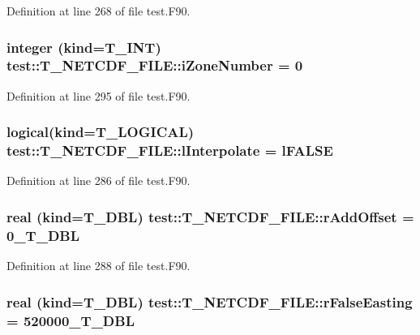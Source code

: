 Definition at line 268 of file test.F90.

\hypertarget{typetest_1_1_t___n_e_t_c_d_f___f_i_l_e_ad7bf8dac2263d91cbf76a6c022f38df5}{
\subsubsection[{iZoneNumber}]{\setlength{\rightskip}{0pt plus 5cm}integer (kind={\bf T\_\-INT}) {\bf test::T\_\-NETCDF\_\-FILE::iZoneNumber} = 0}}
\label{typetest_1_1_t___n_e_t_c_d_f___f_i_l_e_ad7bf8dac2263d91cbf76a6c022f38df5}


Definition at line 295 of file test.F90.

\hypertarget{typetest_1_1_t___n_e_t_c_d_f___f_i_l_e_ad0ad77a4e58dd916eaf322b5dd4429c0}{
\subsubsection[{lInterpolate}]{\setlength{\rightskip}{0pt plus 5cm}logical(kind={\bf T\_\-LOGICAL}) {\bf test::T\_\-NETCDF\_\-FILE::lInterpolate} = {\bf lFALSE}}}
\label{typetest_1_1_t___n_e_t_c_d_f___f_i_l_e_ad0ad77a4e58dd916eaf322b5dd4429c0}


Definition at line 286 of file test.F90.

\hypertarget{typetest_1_1_t___n_e_t_c_d_f___f_i_l_e_a69bbdef63dab58a45d70ab3e374b4e5d}{
\subsubsection[{rAddOffset}]{\setlength{\rightskip}{0pt plus 5cm}real (kind={\bf T\_\-DBL}) {\bf test::T\_\-NETCDF\_\-FILE::rAddOffset} = 0\_\-T\_\-DBL}}
\label{typetest_1_1_t___n_e_t_c_d_f___f_i_l_e_a69bbdef63dab58a45d70ab3e374b4e5d}


Definition at line 288 of file test.F90.

\hypertarget{typetest_1_1_t___n_e_t_c_d_f___f_i_l_e_afd612f182274d620271deea5cbd9abdf}{
\subsubsection[{rFalseEasting}]{\setlength{\rightskip}{0pt plus 5cm}real (kind={\bf T\_\-DBL}) {\bf test::T\_\-NETCDF\_\-FILE::rFalseEasting} = 520000\_\-T\_\-DBL}}
\label{typetest_1_1_t___n_e_t_c_d_f___f_i_l_e_afd612f182274d620271deea5cbd9abdf}


